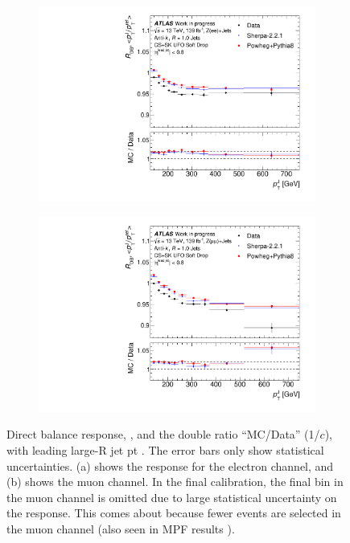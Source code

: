 \begin{figure}[t]
\centering
\begin{subfigure}[b]{0.70\textwidth}
    \centering
    \includegraphics[width=\textwidth]{plots/insitu/Zeejet_response_WIP.pdf}
    \caption{\vspace{20pt}}
    \label{fig:insitufitbal:a}
\end{subfigure}
\hfill
\begin{subfigure}[b]{0.70\textwidth}
    \centering
    \includegraphics[width=\textwidth]{plots/insitu/Zmmjet_response_WIP.pdf}
    \caption{}
    \label{fig:insitfitbal:b}
\end{subfigure}
\caption{Direct balance response, \rdb, and the double ratio ``MC/Data'' (1/$c$), with leading large-R jet pt \ptJ. The error bars only show statistical uncertainties. (a) shows the response for the electron channel, and (b) shows the muon channel. In the final calibration, the final bin in the muon channel is omitted due to large statistical uncertainty on the response. This comes about because fewer events are selected in the muon channel (also seen in MPF results \cite{Insitu:MPFresults}).\label{fig:nominalfitbalance}}%
\end{figure}

